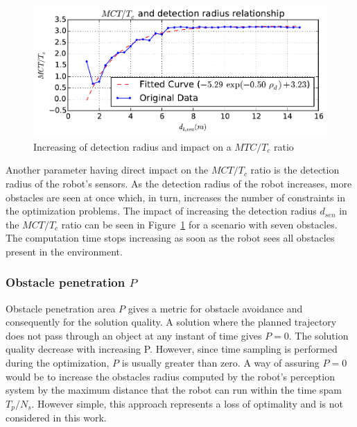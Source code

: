 \documentclass[eprint]{actapoly}
\begin{document}
\begin{figure}[!h]\centering
  \includegraphics[width=\linewidth]{./images/drho/drho-rmp.pdf} %
  \caption{Increasing of detection radius and impact on a $MTC/T_c$ 
ratio\label{fig:drhormp}}
\end{figure}
Another parameter having direct impact on the $MCT/T_c$ ratio is the detection radius
of the robot's sensors.
As the detection radius of the robot increases, more obstacles are
seen at once which, in turn,
increases the number of constraints in the optimization problems.
The impact of increasing the detection radius $d_{sen}$ in the $MCT/T_c$ ratio can
be seen in Figure~\ref{fig:drhormp} for a scenario with seven obstacles.
The computation time stops increasing as soon as the robot sees all obstacles present in the environment.



\subsubsection{Obstacle penetration $P$}

Obstacle penetration area $P$ gives a metric for obstacle avoidance and 
consequently for the solution quality. A solution where the planned trajectory does not pass through 
an object at any instant of time gives $P = 0$. The solution quality decrease with increasing P. 
However, since time sampling is performed during the optimization, $P$ is usually greater than 
zero.
A way of assuring $P = 0$ would  be to increase the obstacles radius computed by the robot's 
perception system by the 
maximum distance that the robot can run within the time spam $T_p/N_s$. However simple,
this approach represents a loss of optimality and is not considered in this work.
\end{document}
